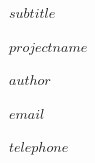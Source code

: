 \begin{titlepage}
\vspace{0.5cm}

\hspace*{2cm}
{\huge {\textcolor{swisstphred}{$subtitle$}} \par} %

\hspace*{2cm}
{\huge {\textcolor{swisstphred}{$projectname$}} \par} %

\vspace{0.5cm}

\hspace*{2cm}
{\large \textbf{$author$}} %

\hspace*{2cm}
{\large $email$} %

\hspace*{2cm}
{\large $telephone$} %


\end{titlepage}
